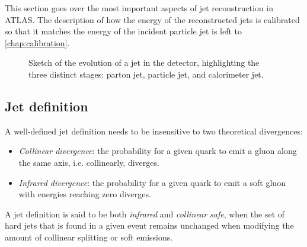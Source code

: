 This section goes over the most important aspects of jet reconstruction in ATLAS.
The description of how the energy of the reconstructed jets is calibrated so that it matches the energy of the incident particle jet is left to \cref{chap:calibration}.

\begin{figure}
    \caption{Sketch of the evolution of a jet in the detector, highlighting the three distinct stages: parton jet, particle jet, and calorimeter jet.}
    \label{fig:jet-evolution}
\end{figure}

\subsection{Jet definition}
A well-defined jet definition needs to be insensitive to two theoretical divergences:
\begin{itemize}
    \item \emph{Collinear divergence}: the probability for a given quark to emit a gluon along the same axis, i.e. collinearly, diverges.
    \item \emph{Infrared divergence}: the probability for a given quark to emit a soft gluon with energies reaching zero diverges.
\end{itemize}
A jet definition is said to be both \emph{infrared} and \emph{collinear safe}, when the set of hard jets that is found in a given event remains unchanged when modifying the amount of collinear splitting or soft emissions.

